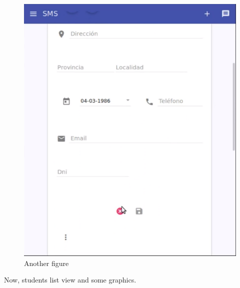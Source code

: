 \begin{figure}[H]
\begin{minipage}{.5\textwidth}
  \includegraphics[scale=0.3]{img/snaps/teacher_profile_update2.png}
  \caption{Another figure}
\end{minipage}
\end{figure}

\noindent Now, students list view and some graphics.

